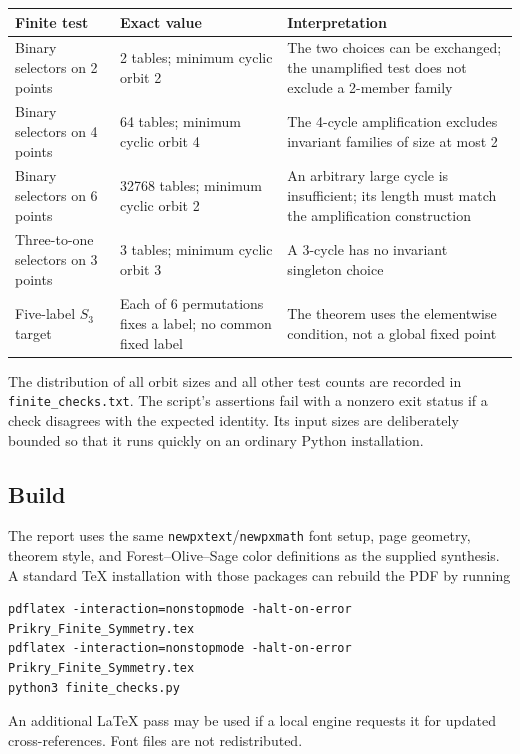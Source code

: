 \documentclass[11pt,letterpaper]{article}
\theoremstyle{definition}
\numberwithin{equation}{section}
\begin{document}
\begin{center}
\small
\renewcommand{\arraystretch}{1.13}
\begin{tabularx}{\textwidth}{@{}P{.29\textwidth}P{.22\textwidth}Y@{}}
\toprule
\textbf{Finite test}&\textbf{Exact value}&\textbf{Interpretation}\\\midrule
Binary selectors on 2 points&2 tables; minimum cyclic orbit 2&The two
choices can be exchanged; the unamplified test does not exclude a
2-member family\\
Binary selectors on 4 points&64 tables; minimum cyclic orbit 4&The
4-cycle amplification excludes invariant families of size at most 2\\
Binary selectors on 6 points&32768 tables; minimum cyclic orbit 2&An
arbitrary large cycle is insufficient; its length must match the
amplification construction\\
Three-to-one selectors on 3 points&3 tables; minimum cyclic orbit 3&A
3-cycle has no invariant singleton choice\\
Five-label $S_3$ target&Each of 6 permutations fixes a label; no common
fixed label&The theorem uses the elementwise condition, not a global
fixed point\\
\bottomrule
\end{tabularx}
\end{center}

The distribution of all orbit sizes and all other test counts are
recorded in \nolinkurl{finite_checks.txt}. The script's assertions fail
with a nonzero exit status if a check disagrees with the expected
identity. Its input sizes are deliberately bounded so that it runs
quickly on an ordinary Python installation.

\subsection*{Build}

The report uses the same \texttt{newpxtext}/\texttt{newpxmath} font setup,
page geometry, theorem style, and Forest--Olive--Sage color definitions
as the supplied synthesis. A standard TeX installation with those
packages can rebuild the PDF by running
\begin{verbatim}
pdflatex -interaction=nonstopmode -halt-on-error Prikry_Finite_Symmetry.tex
pdflatex -interaction=nonstopmode -halt-on-error Prikry_Finite_Symmetry.tex
python3 finite_checks.py
\end{verbatim}
An additional LaTeX pass may be used if a local engine requests it for
updated cross-references. Font files are not redistributed.
\end{document}
